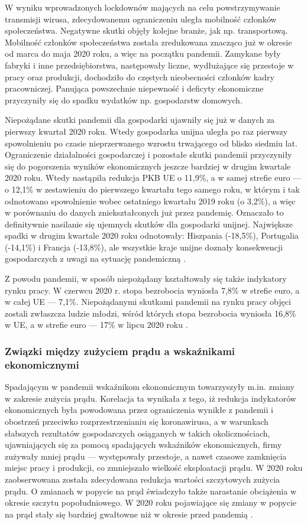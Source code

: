 \documentclass[polish, twoside, 12pt, a4paper]{article}
\theoremstyle{definition}
\theoremstyle{plain}
\theoremstyle{remark}
\begin{document}
W wyniku wprowadzonych lockdownów mających na celu powstrzymywanie transmisji wirusa, zdecydowanemu ograniczeniu uległa mobilność członków społeczeństwa. Negatywne skutki objęły kolejne branże, jak np. transportową. Mobilność członków społeczeństwa została zredukowana znacząco już w okresie od marca do maja 2020 roku, a więc na początku pandemii. Zamykane były fabryki i inne przedsiębiorstwa, następowały liczne, wydłużające się przestoje w pracy oraz produkcji, dochodziło do częstych nieobecności członków kadry pracowniczej. Panująca powszechnie niepewność i deficyty ekonomiczne przyczyniły się do spadku wydatków np. gospodarstw domowych. 

Niepożądane skutki pandemii dla gospodarki ujawniły się już w danych za pierwszy kwartał 2020 roku. Wtedy gospodarka unijna uległa po raz pierwszy spowolnieniu po czasie nieprzerwanego wzrostu trwającego od blisko siedmiu lat. Ograniczenie działalności gospodarczej i pozostałe skutki pandemii przyczyniły się do pogorszenia wyników ekonomicznych jeszcze bardziej w drugim kwartale 2020 roku. Wtedy nastąpiła redukcja PKB UE o 11,9\%, a w samej strefie euro --- o 12,1\% w zestawieniu do pierwszego kwartału tego samego roku, w którym i tak odnotowano spowolnienie wobec ostatniego kwartału 2019 roku (o 3,2\%), a więc w porównaniu do danych zniekształconych już przez pandemię. Oznaczało to definitywnie nasilanie się ujemnych skutków dla gospodarki unijnej. Największe spadki w drugim kwartale 2020 roku odnotowały: Hiszpania (-18,5\%), Portugalia (-14,1\%) i Francja (-13,8\%), ale wszystkie kraje unijne doznały konsekwencji gospodarczych z uwagi na sytuację pandemiczną \citep{dziembala2021}. 

Z powodu pandemii, w sposób niepożądany kształtowały się także indykatory rynku pracy. W czerwcu 2020 r. stopa bezrobocia wyniosła 7,8\% w strefie euro, a w całej UE --- 7,1\%. Niepożądanymi skutkami pandemii na rynku pracy objęci zostali zwłaszcza ludzie młodzi, wśród których stopa bezrobocia wyniosła 16,8\% w UE, a w strefie euro --- 17\% w lipcu 2020 roku \citep{dziembala2021}.

\subsubsection{Związki między zużyciem prądu a wskaźnikami ekonomicznymi}

Spadającym w pandemii wskaźnikom ekonomicznym towarzyszyły m.in. zmiany w zakresie zużycia prądu. Korelacja ta wynikała z tego, iż redukcja indykatorów ekonomicznych była powodowana przez ograniczenia wynikłe z pandemii i obostrzeń przeciwko rozprzestrzenianiu się koronawirusa, a w warunkach słabszych rezultatów gospodarczych osiąganych w takich okolicznościach, ujawniających się za pomocą spadających wskaźników ekonomicznych, firmy zużywały mniej prądu --- występowały przestoje, a nawet czasowe zamknięcia miejsc pracy i produkcji, co zmniejszało wielkość eksploatacji prądu. W 2020 roku zaobserwowana została zdecydowana redukcja wartości szczytowych zużycia prądu. O zmianach w popycie na prąd świadczyło także narastanie obciążenia w okresie szczytu popołudniowego. W 2020 roku pojawiające się zmiany w popycie na prąd stały się bardziej gwałtowne niż w okresie przed pandemią \citep{stahl2021}. 
\end{document}

